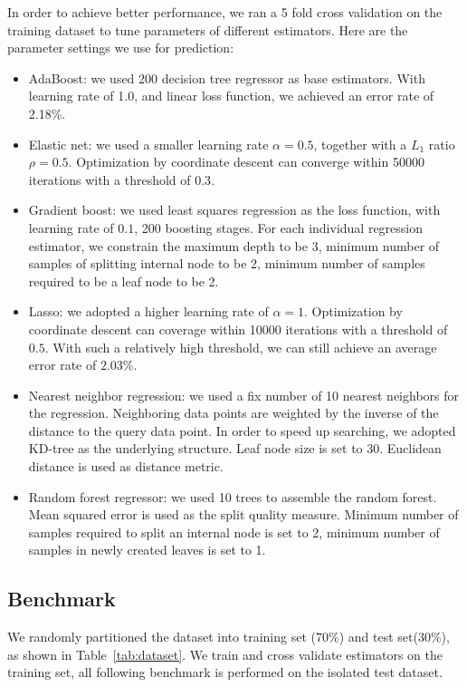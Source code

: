 In order to achieve better performance, we ran a 5 fold cross validation on the
training dataset to tune parameters of different estimators. Here are the
parameter settings we use for prediction:
\begin{itemize}
   \item AdaBoost: we used 200 decision tree regressor as base estimators. With
      learning rate of 1.0, and linear loss function, we achieved an error rate
      of 2.18\%.
   \item Elastic net: we used a smaller learning rate $\alpha=0.5$, together
      with a $L_1$ ratio $\rho=0.5$. Optimization by coordinate descent can
      converge within 50000 iterations with a threshold of $0.3$.
   \item Gradient boost: we used least squares regression as the loss function,
      with learning rate of $0.1$, 200 boosting stages. For each individual
      regression estimator, we constrain the maximum depth to be 3, minimum
      number of samples of splitting internal node to be 2, minimum number of
      samples required to be a leaf node to be 2.
   \item Lasso: we adopted a higher learning rate of $\alpha=1$. Optimization
      by coordinate descent can coverage within 10000 iterations with a
      threshold of $0.5$. With such a relatively high threshold, we can still
      achieve an average error rate of $2.03\%$.
   \item Nearest neighbor regression: we used a fix number of 10 nearest
      neighbors for the regression. Neighboring data points are weighted by
      the inverse of the distance to the query data point. In order to speed up
      searching, we adopted KD-tree as the underlying structure. Leaf node size
      is set to 30. Euclidean distance is used as distance metric.
   \item Random forest regressor: we used 10 trees to assemble the random
      forest. Mean squared error is used as the split quality measure. Minimum
      number of samples required to split an internal node is set to 2, minimum
      number of samples in newly created leaves is set to 1.
\end{itemize}

\subsection{Benchmark}
\label{sub:benchmark}

We randomly partitioned the dataset into training set (70\%) and test
set(30\%), as shown in Table~\ref{tab:dataset}. We train and cross validate
estimators on the training set, all following benchmark is performed on the
isolated test dataset.

